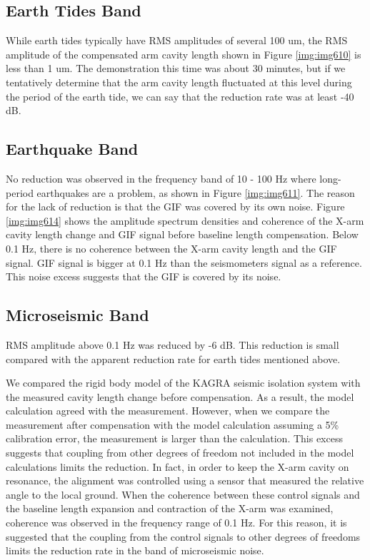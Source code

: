 \subsection{Earth Tides Band}
While earth tides typically have RMS amplitudes of several 100 um, the RMS amplitude of the compensated arm cavity length shown in Figure \ref{img:img610} is less than 1 um. The demonstration this time was about 30 minutes, but if we tentatively determine that the arm cavity length fluctuated at this level during the period of the earth tide, we can say that the reduction rate was at least -40 dB.

\subsection{Earthquake Band}
No reduction was observed in the frequency band of 10 - 100 Hz where long-period earthquakes are a problem, as shown in Figure \ref{img:img611}. The reason for the lack of reduction is that the GIF was covered by its own noise. Figure \ref{img:img614} shows the amplitude spectrum densities and coherence of the X-arm cavity length change and GIF signal before baseline length compensation. Below 0.1 Hz, there is no coherence between the X-arm cavity length and the GIF signal. GIF signal is bigger at 0.1 Hz than the seismometers signal as a reference. This noise excess suggests that the GIF is covered by its noise. 

\subsection{Microseismic Band}
RMS amplitude above 0.1 Hz was reduced by -6 dB. This reduction is small compared with the apparent reduction rate for earth tides mentioned above. 

We compared the rigid body model of the KAGRA seismic isolation system with the measured cavity length change before compensation. As a result, the model calculation agreed with the measurement. However, when we compare the measurement after compensation with the model calculation assuming a 5\% calibration error, the measurement is larger than the calculation. This excess suggests that coupling from other degrees of freedom not included in the model calculations limits the reduction. In fact, in order to keep the X-arm cavity on resonance, the alignment was controlled using a sensor that measured the relative angle to the local ground. When the coherence between these control signals and the baseline length expansion and contraction of the X-arm was examined, coherence was observed in the frequency range of 0.1 Hz. For this reason, it is suggested that the coupling from the control signals to other degrees of freedoms limits the reduction rate in the band of microseismic noise.


